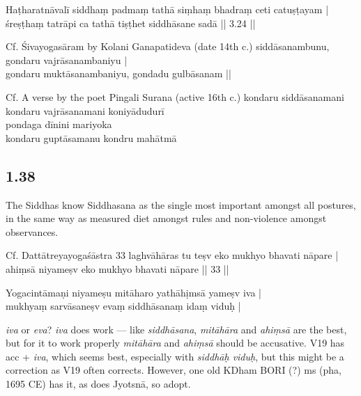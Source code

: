 \begin{ekdosis}
\begin{testimonia}[hp01_037]
Haṭharatnāvalī
\startverse
siddhaṃ padmaṃ tathā siṃhaṃ bhadraṃ ceti catuṣṭayam |\\
śreṣṭhaṃ tatrāpi ca tathā tiṣṭhet siddhāsane sadā || 3.24 ||
\endverse

Cf. Śivayogasāram by Kolani Ganapatideva (date 14th c.)
\startverse
siddāsanambunu, gondaru vajrāsanambaniyu | \\
gondaru muktāsanambaniyu, gondadu  gulbāsanam ||
\endverse

Cf. A verse by the poet Pingali Surana (active 16th c.)
\startverse
kondaru siddāsanamani \\
kondaru vajrāsanamani koniyādudurī \\
pondaga dīnini mariyoka \\
kondaru guptāsamanu kondru mahātmā
\endverse
\end{testimonia}

\subsection*{1.38}
\begin{translation}[hp01_038]
The Siddhas know Siddhasana as the single most important amongst
all postures, in the same way as measured diet amongst rules and non-violence amongst observances.
\end{translation}

\begin{sources}[hp01_038]
Cf. Dattātreyayogaśāstra 33
\startverse
laghvāhāras tu teṣv eko mukhyo bhavati nāpare |\\
ahiṃsā niyameṣv eko mukhyo bhavati nāpare || 33 ||
\endverse
\end{sources}

\begin{testimonia}[hp01_038]
Yogacintāmaṇi
\startverse
niyameṣu mitāharo yathāhịmsā yameṣv iva |\\
mukhyaṃ sarvāsaneṣv evaṃ siddhāsanaṃ idaṃ viduḥ |
\endverse
\end{testimonia}

\begin{philcomm}[hp01_038]
\emph{iva} or \emph{eva}? \emph{iva} does work — like \emph{siddhāsana}, \emph{mitāhāra} and \emph{ahiṃsā} are the best, but for it to work properly \emph{mitāhāra} and \emph{ahiṃsā} should be accusative. V19 has acc + \emph{iva}, which seems best, especially with \emph{siddhāḥ viduḥ}, but this might be a correction as V19 often corrects. However, one old KDham BORI (?) ms (pha, 1695 CE) has it, as does Jyotsnā, so adopt.


\end{philcomm}
\end{ekdosis}
